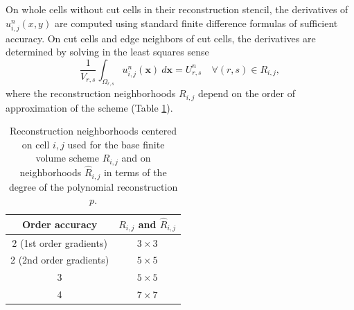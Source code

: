 On whole cells without cut cells in their reconstruction stencil, the derivatives of $u^n_{i,j}(x,y)$ are computed using standard finite difference formulas of sufficient accuracy.
On cut cells and edge neighbors of cut cells, the derivatives are determined by solving in the least squares sense
\begin{equation}\label{eq:ls_base}
\frac{1}{V_{r,s}}\int_{\Omega_{r,s}} u^n_{i,j}(\mathbf{x})~d\mathbf{x} = U^n_{r,s} \quad \forall (r,s) \in R_{i,j},
\end{equation}
where the reconstruction neighborhoods $R_{i,j}$ depend on the order of approximation of the scheme (Table \ref{tab:reconneigh}).
\begin{table}
	\centering
	\begin{tabular}{|c|c|}
		\hline 
		Order accuracy & $R_{i,j}$ and $\hat R_{i,j}$ \\
		\hline
		2 (1st order gradients) &  $3 \times 3 $ \\
		\hline
		2 (2nd order gradients) &  $5 \times 5 $ \\
		\hline
		3 & $5 \times 5$ \\
		\hline
		4 & $7 \times 7$ \\
		\hline
	\end{tabular} 
	\caption{Reconstruction neighborhoods centered on cell $i,j$ used for the base finite volume scheme $R_{i,j}$ and on neighborhoods $\widehat{R}_{i,j}$ in terms of the degree of the polynomial reconstruction $p$.  
} \label{tab:reconneigh}
\end{table}

